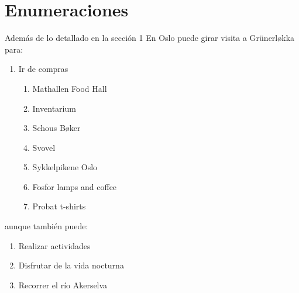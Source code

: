 \documentclass[12pt,
              ]{article}
\begin{document}
	\section{Enumeraciones}
	
	Además de lo detallado en la sección 1 En Oslo puede girar visita a Grünerløkka para:
	
	\begin{enumerate}
		\item Ir de compras
		\begin{enumerate}
			\item Mathallen Food Hall
			\item Inventarium
			\item Schous Bøker
			\item Svovel
			\item Sykkelpikene Oslo
			\item Fosfor lamps and coffee
			\item Probat t-shirts
		\end{enumerate}
	\end{enumerate}

	aunque también puede:
	\begin{enumerate}[resume]
		\item Realizar actividades
		\item Disfrutar de la vida nocturna
		\item Recorrer el río Akerselva	
	\end{enumerate}
\end{document}
